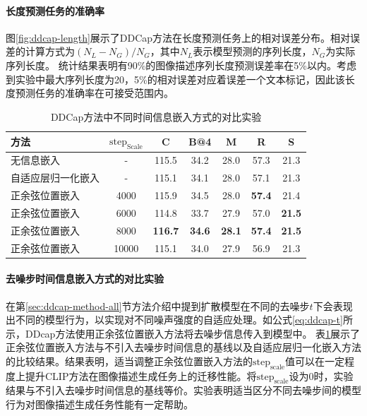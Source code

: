 \paragraph{长度预测任务的准确率} 图\ref{fig:ddcap-length}展示了DDCap方法在长度预测任务上的相对误差分布。相对误差的计算方式为$(N_{L}-N_{G})/N_{G}$，其中$N_{L}$表示模型预测的序列长度，$N_{G}$为实际序列长度。
统计结果表明有90\%的图像描述序列长度预测误差率在5\%以内。考虑到实验中最大序列长度为20，5\%的相对误差对应着误差一个文本标记，因此该长度预测任务的准确率在可接受范围内。

\begin{table}
  \centering
  \caption{DDCap方法中不同时间信息嵌入方式的对比实验}
  \begin{tabular}{lcccccc}
    \toprule
    方法 & $\text{step}_{\text{Scale}}$ & C & B@4 & M & R & S\\
    \midrule
    无信息嵌入 & - & 115.5 & 34.2  & 28.0 & 57.3 & 21.3\\
    自适应层归一化嵌入 & - & 115.1  & 34.1 & 28.0 & 57.1 & 21.3\\
    正余弦位置嵌入 & 4000 & 115.9 & 34.5  & 28.0 & \textbf{57.4} & 21.4\\
    正余弦位置嵌入 & 6000 & 114.8  & 33.7  & 27.9 & 57.0 & \textbf{21.5}\\
   正余弦位置嵌入 & 8000 & \textbf{116.7}  & \textbf{34.6}  & \textbf{28.1} & \textbf{57.4} & \textbf{21.5}\\
   正余弦位置嵌入 & 10000 & 115.1  & 34.0  & 27.9 & 56.9 & 21.3\\
    \bottomrule
  \end{tabular}
  \label{tab:ddcap-adaptivet}
\end{table}

\paragraph{去噪步时间信息嵌入方式的对比实验} 
在第\ref{sec:ddcap-method-all}节方法介绍中提到扩散模型在不同的去噪步$t$下会表现出不同的模型行为，以实现对不同噪声强度的自适应处理。如公式\eqref{eq:ddcap-t}所示，DDcap方法使用正余弦位置嵌入方法将去噪步信息传入到模型中。
表\ref{tab:ddcap-adaptivet}展示了正余弦位置嵌入方法与不引入去噪步时间信息的基线以及自适应层归一化嵌入方法的比较结果。结果表明，适当调整正余弦位置嵌入方法的$\text{step}_{\text{scale}}$值可以在一定程度上提升CLIP方法在图像描述生成任务上的迁移性能。将$\text{step}_{\text{scale}}$设为0时，实验结果与不引入去噪步时间信息的基线等价。实验表明适当区分不同去噪步间的模型行为对图像描述生成任务性能有一定帮助。


